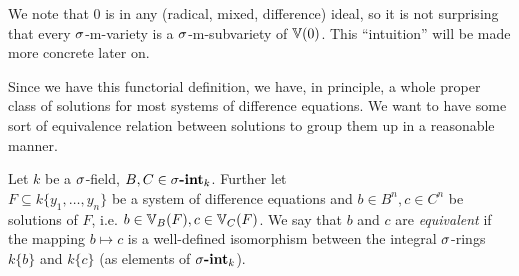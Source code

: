 We note that $0$ is in any (radical, mixed, difference) ideal, so it is not surprising that every $\sigma$-m-variety is a $\sigma$-m-subvariety of $\mathbb{V}(0)$. This ``intuition'' will be made more concrete later on.

Since we have this functorial definition, we have, in principle, a whole proper class of solutions for most systems of difference equations. 
We want to have some sort of equivalence relation between solutions to group them up in a reasonable manner.

\begin{defn}\label{equivsols}
Let $k$ be a $\sigma$-field, $B,C \in \sigma\text{{\normalfont\textbf{-int}}}_k$. Further let \\ $F \subseteq k\{y_1,\ldots,y_n\}$ be a system of difference equations and $b \in B^n, c \in C^n$ be solutions of $F$, i.e. $b \in \mathbb{V}_B(F), c \in \mathbb{V}_C(F)$.
We say that $b$ and $c$ are \emph{equivalent} if the mapping $b \mapsto c$ is a well-defined isomorphism between the integral $\sigma$-rings $k\{b\}$ and $k\{c\}$  (as elements of $\sigma\text{{\normalfont\textbf{-int}}}_k$). 
\end{defn}


